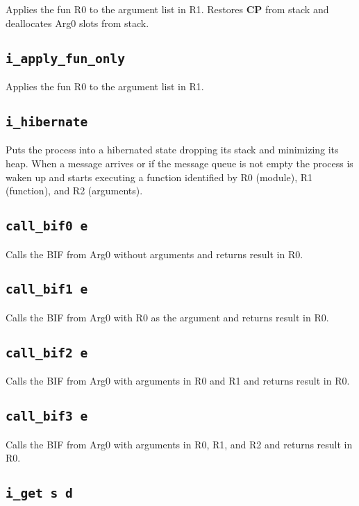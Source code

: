 \documentclass{article}
\newcommand{\cp}{\textbf{CP}}
\newcommand{\iop}[1]{\texttt{#1}}
\begin{document}
Applies the fun R0 to the argument list in R1. Restores \cp{} from stack and
deallocates Arg0 slots from stack.

\subsection*{\iop{i\_apply\_fun\_only}}

Applies the fun R0 to the argument list in R1.

\subsection*{\iop{i\_hibernate}}

Puts the process into a hibernated state dropping its stack and minimizing its
heap. When a message arrives or if the message queue is not empty the process is
waken up and starts executing a function identified by R0 (module), R1
(function), and R2 (arguments).

\subsection*{\iop{call\_bif0 e}}

Calls the BIF from Arg0 without arguments and returns result in R0.

\subsection*{\iop{call\_bif1 e}}

Calls the BIF from Arg0 with R0 as the argument and returns result in R0.

\subsection*{\iop{call\_bif2 e}}

Calls the BIF from Arg0 with arguments in R0 and R1 and returns result in R0.

\subsection*{\iop{call\_bif3 e}}

Calls the BIF from Arg0 with arguments in R0, R1, and R2 and returns result in R0.

\subsection*{\iop{i\_get s d}}
\end{document}
